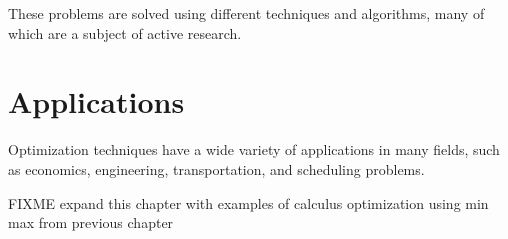 These problems are solved using different techniques and algorithms,
many of which are a subject of active research.

\section{Applications}

Optimization techniques have a wide variety of applications in many
fields, such as economics, engineering, transportation, and scheduling
problems.

FIXME expand this chapter with examples of calculus optimization using min max from previous chapter